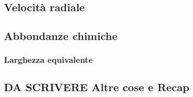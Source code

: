 \subsection{Velocità radiale}
\subsection{Abbondanze chimiche}
\subsubsection{Larghezza equivalente}
\subsection{DA SCRIVERE Altre cose e Recap}